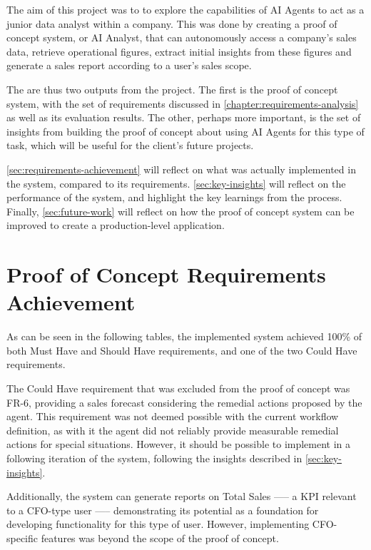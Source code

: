 \documentclass[a4paper]{report}
\begin{document}
The aim of this project was to to explore the capabilities of AI Agents to act as a junior data analyst within a company. This was done by creating a proof of concept system, or AI Analyst, that can autonomously access a company's sales data, retrieve operational figures, extract initial insights from these figures and generate a sales report according to a user's sales scope.

The are thus two outputs from the project. The first is the proof of concept system, with the set of requirements discussed in \autoref{chapter:requirements-analysis} as well as its evaluation results. The other, perhaps more important, is the set of insights from building the proof of concept about using AI Agents for this type of task, which will be useful for the client's future projects.

\autoref{sec:requirements-achievement} will reflect on what was actually implemented in the system, compared to its requirements. \autoref{sec:key-insights} will reflect on the performance of the system, and highlight the key learnings from the process. Finally, \autoref{sec:future-work} will reflect on how the proof of concept system can be improved to create a production-level application.

\section{Proof of Concept Requirements Achievement}
\label{sec:requirements-achievement}

As can be seen in the following tables, the implemented system achieved 100\% of both Must Have and Should Have requirements, and one of the two Could Have requirements.

The Could Have requirement that was excluded from the proof of concept was FR-6, providing a sales forecast considering the remedial actions proposed by the agent. This requirement was not deemed possible with the current workflow definition, as with it the agent did not reliably provide measurable remedial actions for special situations. However, it should be possible to implement in a following iteration of the system, following the insights described in \autoref{sec:key-insights}.

Additionally, the system can generate reports on Total Sales —-- a KPI relevant to a CFO-type user —-- demonstrating its potential as a foundation for developing functionality for this type of user. However, implementing CFO-specific features was beyond the scope of the proof of concept.
\end{document}

